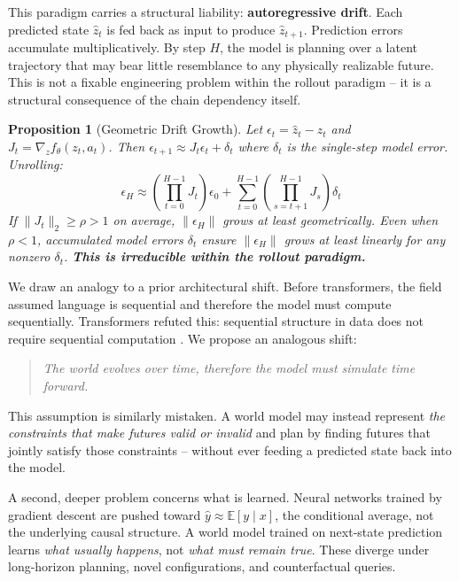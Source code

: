 \documentclass[12pt]{article}
\newtheorem{proposition}{Proposition}
\begin{document}
This paradigm carries a structural liability: \textbf{autoregressive drift}. Each predicted state $\hat{z}_t$ is fed back as input to produce $\hat{z}_{t+1}$. Prediction errors accumulate multiplicatively. By step $H$, the model is planning over a latent trajectory that may bear little resemblance to any physically realizable future. This is not a fixable engineering problem within the rollout paradigm -- it is a structural consequence of the chain dependency itself.

\begin{proposition}[Geometric Drift Growth]
\label{prop:drift}
Let $\epsilon_t = \hat{z}_t - z_t$ and $J_t = \nabla_z f_\theta(z_t, a_t)$. Then $\epsilon_{t+1} \approx J_t \epsilon_t + \delta_t$ where $\delta_t$ is the single-step model error. Unrolling:
\[
  \epsilon_H \approx \left(\prod_{t=0}^{H-1} J_t\right)\epsilon_0 + \sum_{t=0}^{H-1}\left(\prod_{s=t+1}^{H-1} J_s\right)\delta_t
\]
If $\|J_t\|_2 \geq \rho > 1$ on average, $\|\epsilon_H\|$ grows at least geometrically. Even when $\rho < 1$, accumulated model errors $\delta_t$ ensure $\|\epsilon_H\|$ grows at least linearly for any nonzero $\delta_t$. \textbf{This is irreducible within the rollout paradigm.}
\end{proposition}

We draw an analogy to a prior architectural shift. Before transformers, the field assumed language is sequential and therefore the model must compute sequentially. Transformers refuted this: sequential structure in data does not require sequential computation \citep{vaswani2017attention}. We propose an analogous shift:
\begin{quote}
\textit{The world evolves over time, therefore the model must simulate time forward.}
\end{quote}
This assumption is similarly mistaken. A world model may instead represent \emph{the constraints that make futures valid or invalid} and plan by finding futures that jointly satisfy those constraints -- without ever feeding a predicted state back into the model.

A second, deeper problem concerns what is learned. Neural networks trained by gradient descent are pushed toward $\hat{y} \approx \mathbb{E}[y \mid x]$, the conditional average, not the underlying causal structure. A world model trained on next-state prediction learns \emph{what usually happens}, not \emph{what must remain true}. These diverge under long-horizon planning, novel configurations, and counterfactual queries.
\end{document}
